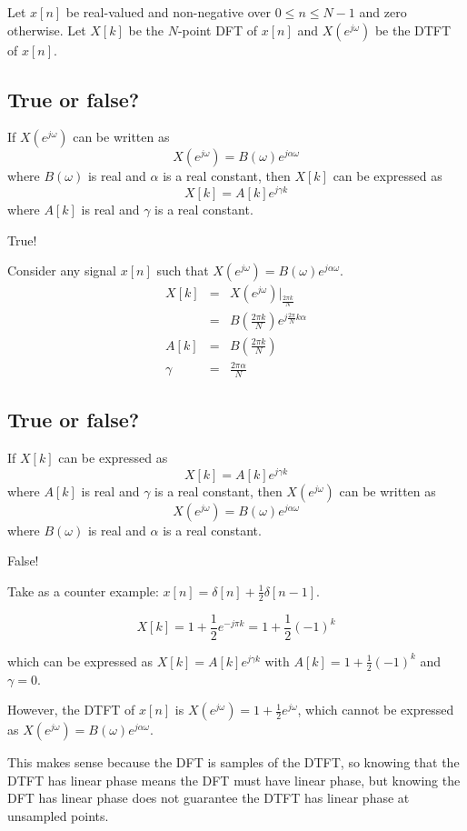 \documentclass[11pt]{article}
\begin{document}
Let $x[n]$ be real-valued and non-negative over $0\leq n \leq N-1$ and zero otherwise. Let $X[k]$ be the $N$-point DFT of $x[n]$ and $X(e^{j\omega})$ be the DTFT of $x[n]$.

\subsection*{True or false?}
If $X(e^{j\omega})$ can be written as 
\[X(e^{j\omega})=B(\omega)e^{j \alpha \omega}\]
where $B(\omega)$ is real and $\alpha$ is a real constant, then $X[k]$ can be expressed as \[X[k]=A[k]e^{j \gamma k}\]
where $A[k]$ is real and $\gamma$ is a real constant.

{ \color{blue}
True! 

Consider any signal $x[n]$ such that $X(e^{j\omega}) = B(\omega)e^{j\alpha \omega}$.
\begin{eqnarray*}
X[k] &=& X(e^{j\omega})\big|_{\frac{2 \pi k}{N}} \\ 
&=& B\left(\frac{2 \pi k}{N}\right)e^{j\frac{2 \pi}{N}k \alpha} \\
A[k] &=& B\left({\frac{2 \pi k}{N}}\right) \\
\gamma &=& \frac{2 \pi \alpha}{N}
\end{eqnarray*}
}

\subsection*{True or false?}
If $X[k]$ can be expressed as 
\[X[k]=A[k]e^{j \gamma k}\]
where $A[k]$ is real and $\gamma$ is a real constant, then $X(e^{j\omega})$ can be written as \[X(e^{j\omega})=B(\omega)e^{j \alpha \omega}\]
where $B(\omega)$ is real and $\alpha$ is a real constant.

{ \color{blue}
False!

Take as a counter example: $x[n] = \delta[n]+\frac{1}{2}\delta[n-1]$.

\[
X[k] = 1+\frac{1}{2}e^{-j\pi k} = 1+\frac{1}{2}(-1)^k
\]

which can be expressed as $X[k] = A[k] e^{j\gamma k}$ with $A[k] = 1+\frac{1}{2}(-1)^k$ and $\gamma = 0$.

However, the DTFT of $x[n]$ is $X(e^{j \omega}) = 1 + \frac{1}{2}e^{j\omega}$, which cannot be expressed as $X(e^{j\omega}) = B(\omega)e^{j\alpha\omega}$.

This makes sense because the DFT is samples of the DTFT, so knowing that the DTFT has linear phase means the DFT must have linear phase, but knowing the DFT has linear phase does not guarantee the DTFT has linear phase at unsampled points.
}
\end{document}
